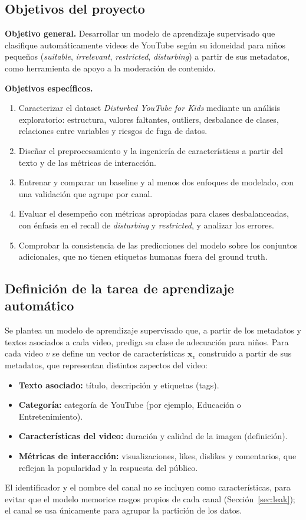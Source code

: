\documentclass[conference]{IEEEtran}
\begin{document}
\subsection{Objetivos del proyecto}\label{sec:obj}
\textbf{Objetivo general.} Desarrollar un modelo de aprendizaje supervisado que clasifique automáticamente videos de YouTube según su idoneidad para niños pequeños (\textit{suitable}, \textit{irrelevant}, \textit{restricted}, \textit{disturbing}) a partir de sus metadatos, como herramienta de apoyo a la moderación de contenido.

\textbf{Objetivos específicos.}
\begin{enumerate}
\item Caracterizar el dataset \textit{Disturbed YouTube for Kids} mediante un análisis exploratorio: estructura, valores faltantes, outliers, desbalance de clases, relaciones entre variables y riesgos de fuga de datos.
\item Diseñar el preprocesamiento y la ingeniería de características a partir del texto y de las métricas de interacción.
\item Entrenar y comparar un baseline y al menos dos enfoques de modelado, con una validación que agrupe por canal.
\item Evaluar el desempeño con métricas apropiadas para clases desbalanceadas, con énfasis en el recall de \textit{disturbing} y \textit{restricted}, y analizar los errores.
\item Comprobar la consistencia de las predicciones del modelo sobre los conjuntos adicionales, que no tienen etiquetas humanas fuera del ground truth.
\end{enumerate}

\subsection{Definición de la tarea de aprendizaje automático}
Se plantea un modelo de aprendizaje supervisado que, a partir de los metadatos y textos asociados a cada video, prediga su clase de adecuación para niños. Para cada video $v$ se define un vector de características $\mathbf{x}_v$ construido a partir de sus metadatos, que representan distintos aspectos del video:
\begin{itemize}
\item \textbf{Texto asociado:} título, descripción y etiquetas (tags).
\item \textbf{Categoría:} categoría de YouTube (por ejemplo, Educación o Entretenimiento).
\item \textbf{Características del video:} duración y calidad de la imagen (definición).
\item \textbf{Métricas de interacción:} visualizaciones, likes, dislikes y comentarios, que reflejan la popularidad y la respuesta del público.
\end{itemize}
El identificador y el nombre del canal no se incluyen como características, para evitar que el modelo memorice rasgos propios de cada canal (Sección~\ref{sec:leak}); el canal se usa únicamente para agrupar la partición de los datos.
\end{document}
